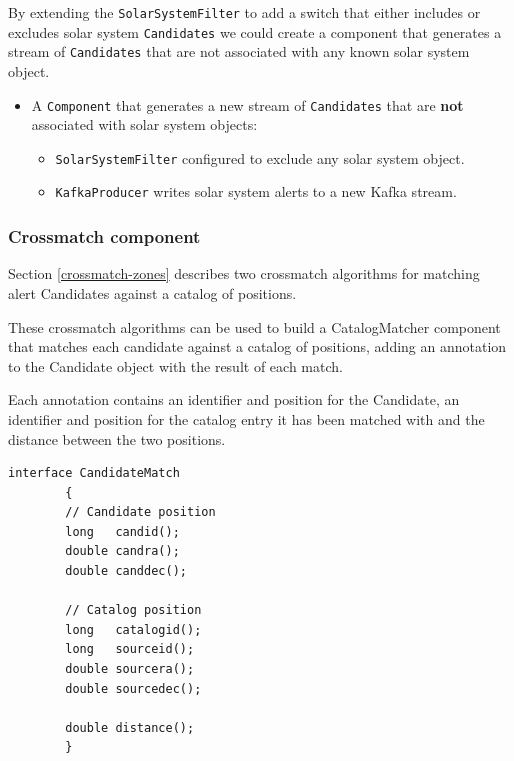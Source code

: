 \documentclass{article}
\newcommand{\kafka} {Kafka\xspace}
\newcommand{\crossmatch} {crossmatch\xspace}
\newcommand{\catalog} {catalog\xspace}
\newcommand{\javaname}[1] {{\ttfamily\color{codeblue} #1}}
\begin{document}
By extending the \texttt{SolarSystemFilter} to add a switch that either includes or excludes solar system \texttt{Candidates} we could create a component that generates a stream of \texttt{Candidates} that are not associated with any known solar system object.

\begin{itemize}
    \item A \texttt{Component} that generates a new stream of \texttt{Candidates} that are \textbf{not} associated with solar system objects:
    \begin{itemize}
        \item \texttt{SolarSystemFilter} configured to exclude any solar system object.
    \end{itemize}
    \begin{itemize}
        \item \texttt{KafkaProducer} writes solar system alerts to a new \kafka stream.
    \end{itemize}
\end{itemize}

\subsubsection{Crossmatch component}
\label{workflow.cross-match}

Section \ref{crossmatch-zones} describes two \crossmatch algorithms for matching alert Candidates against a \catalog of positions.

These \crossmatch algorithms can be used to build a \javaname{CatalogMatcher} component that matches each candidate against a \catalog of positions, adding an annotation to the \javaname{Candidate} object with the result of each match.

Each annotation contains an identifier and position for the \javaname{Candidate}, an identifier and position for the \catalog entry it has been matched with and the distance between the two positions.

\begin{lstlisting}[style=Java]
    interface CandidateMatch
        {
        // Candidate position
        long   candid();
        double candra();
        double canddec();

        // Catalog position
        long   catalogid();
        long   sourceid();
        double sourcera();
        double sourcedec();

        double distance();
        }
\end{lstlisting}
\end{document}
